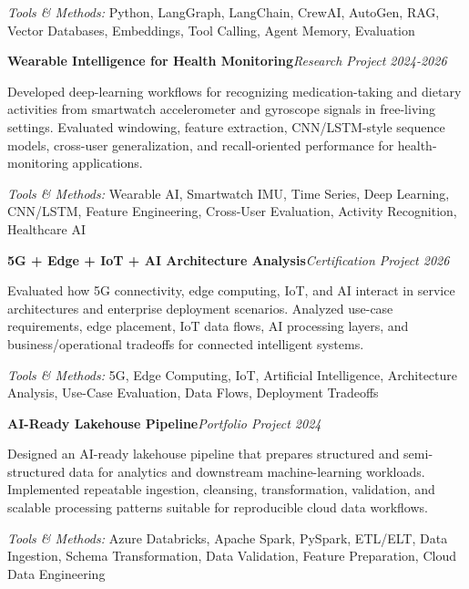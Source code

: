 \documentclass[9pt,letterpaper]{extarticle}
\newcommand{\entry}[2]{\Needspace{4\baselineskip}\textbf{#1}\hfill\textit{#2}\par}
\begin{document}
{\small\textit{Tools \& Methods:} Python, LangGraph, LangChain, CrewAI, AutoGen, RAG, Vector Databases, Embeddings, Tool Calling, Agent Memory, Evaluation\par}
\vspace{1pt}
\entry{Wearable Intelligence for Health Monitoring}{Research Project \textbar{} 2024-2026}
Developed deep-learning workflows for recognizing medication-taking and dietary activities from smartwatch accelerometer and gyroscope signals in free-living settings. Evaluated windowing, feature extraction, CNN/LSTM-style sequence models, cross-user generalization, and recall-oriented performance for health-monitoring applications.\par
{\small\textit{Tools \& Methods:} Wearable AI, Smartwatch IMU, Time Series, Deep Learning, CNN/LSTM, Feature Engineering, Cross-User Evaluation, Activity Recognition, Healthcare AI\par}
\vspace{1pt}
\entry{5G + Edge + IoT + AI Architecture Analysis}{Certification Project \textbar{} 2026}
Evaluated how 5G connectivity, edge computing, IoT, and AI interact in service architectures and enterprise deployment scenarios. Analyzed use-case requirements, edge placement, IoT data flows, AI processing layers, and business/operational tradeoffs for connected intelligent systems.\par
{\small\textit{Tools \& Methods:} 5G, Edge Computing, IoT, Artificial Intelligence, Architecture Analysis, Use-Case Evaluation, Data Flows, Deployment Tradeoffs\par}
\vspace{1pt}
\entry{AI-Ready Lakehouse Pipeline}{Portfolio Project \textbar{} 2024}
Designed an AI-ready lakehouse pipeline that prepares structured and semi-structured data for analytics and downstream machine-learning workloads. Implemented repeatable ingestion, cleansing, transformation, validation, and scalable processing patterns suitable for reproducible cloud data workflows.\par
{\small\textit{Tools \& Methods:} Azure Databricks, Apache Spark, PySpark, ETL/ELT, Data Ingestion, Schema Transformation, Data Validation, Feature Preparation, Cloud Data Engineering\par}
\vspace{1pt}
\end{document}
